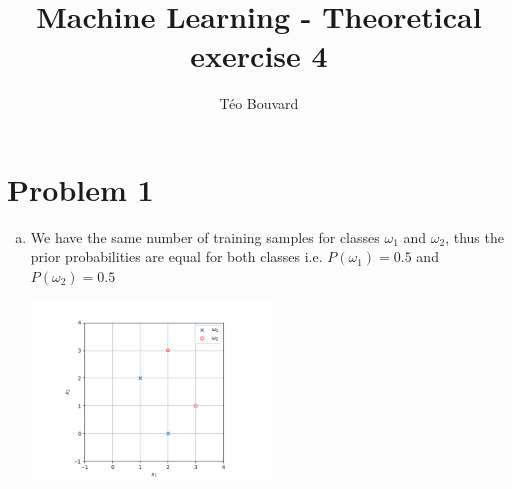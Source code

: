 \documentclass[a4paper, 10pt, twoside]{article}
\begin{document}
\title{Machine Learning - Theoretical exercise 4}
\author{T\'eo Bouvard}
\maketitle

\section*{Problem 1}
\begin{enumerate}[a)]
    \item We have the same number of training samples for classes $\omega_1$ and $\omega_2$, thus the prior probabilities are equal for both classes i.e. $P(\omega_1)=0.5$ and $P(\omega_2)=0.5$

          \begin{center}
              \includegraphics[width=0.5\textwidth]{img/graph1.png}
          \end{center}


\end{enumerate}
\end{document}
